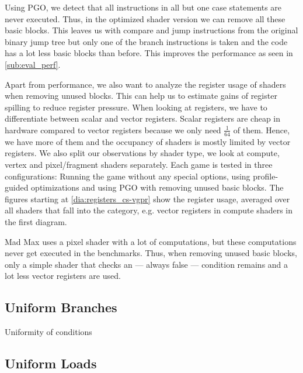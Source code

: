 Using PGO, we detect that all instructions in all but one case statements are never executed.
Thus, in the optimized shader version we can remove all these basic blocks.
This leaves us with compare and jump instructions from the original binary jump tree but only one of the branch instructions is taken and the code has a lot less basic blocks than before.
This improves the performance as seen in \cref{sub:eval_perf}.

Apart from performance, we also want to analyze the register usage of shaders when removing unused blocks.
This can help us to estimate gains of register spilling to reduce register pressure.
When looking at registers, we have to differentiate between scalar and vector registers.
Scalar registers are cheap in hardware compared to vector registers because we only need $\frac{1}{64}$ of them.
Hence, we have more of them and the occupancy of shaders is mostly limited by vector registers.
We also split our observations by shader type, we look at compute, vertex and pixel/fragment shaders separately.
Each game is tested in three configurations: Running the game without any special options, using profile-guided optimizations and using PGO with removing unused basic blocks.
The figures starting at \cref{dia:registers_cs-vgpr} show the register usage, averaged over all shaders that fall into the category, e.g. vector registers in compute shaders in the first diagram.


Mad Max uses a pixel shader with a lot of computations, but these computations never get executed in the benchmarks.
Thus, when removing unused basic blocks, only a simple shader that checks an --- always false --- condition remains and a lot less vector registers are used.



\subsection{Uniform Branches}
\label{sub:eval_uniform_branches}
Uniformity of conditions



\subsection{Uniform Loads}
\label{sub:eval_uniform_loads}



